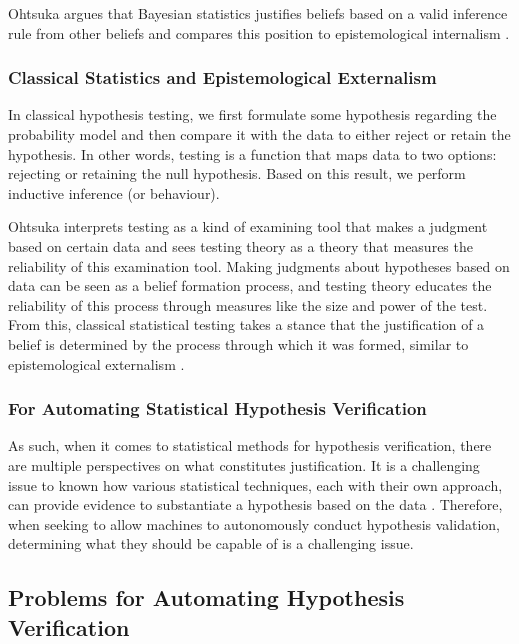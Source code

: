 \documentclass{book}
\begin{document}
Ohtsuka argues that Bayesian statistics justifies beliefs based on a valid inference rule from other beliefs and compares this position to epistemological internalism \cite{otsuka2022thinking}.

\subsubsection{Classical Statistics and Epistemological Externalism}
In classical hypothesis testing, we first formulate some hypothesis regarding the probability model and then compare it with the data to either reject or retain the hypothesis. In other words, testing is a function that maps data to two options: rejecting or retaining the null hypothesis. Based on this result, we perform inductive inference (or behaviour). 

Ohtsuka interprets testing as a kind of examining tool that makes a judgment based on certain data and sees testing theory as a theory that measures the reliability of this examination tool. Making judgments about hypotheses based on data can be seen as a belief formation process, and testing theory educates the reliability of this process through measures like the size and power of the test. From this, classical statistical testing takes a stance that the justification of a belief is determined by the process through which it was formed, similar to epistemological externalism \cite{otsuka2022thinking}.

\subsubsection{For Automating Statistical Hypothesis Verification}

As such, when it comes to statistical methods for hypothesis verification, there are multiple perspectives on what constitutes justification. It is a challenging issue to known how various statistical techniques, each with their own approach, can provide evidence to substantiate a hypothesis based on the data \cite{otsuka2022thinking,sober2008evidence,sep-statistics}. Therefore, when seeking to allow machines to autonomously conduct hypothesis validation, determining what they should be capable of is a challenging issue.

\subsection{Problems for Automating Hypothesis Verification}
\end{document}
